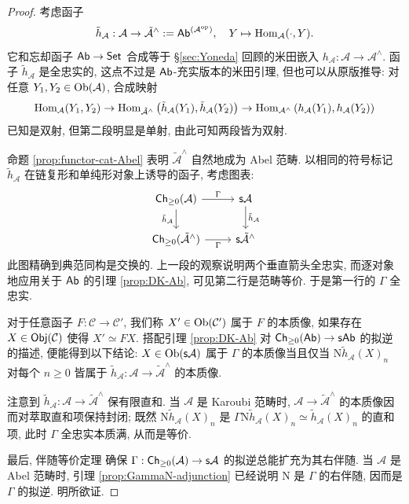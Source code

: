 \begin{proof}
	考虑函子
	\[ \tilde{h}_{\mathcal{A}}: \mathcal{A} \to \tilde{\mathcal{A}}^\wedge := \mathsf{Ab}^{(\mathcal{A}^{\operatorname{op}})}, \quad Y \mapsto \operatorname{Hom}_{\mathcal{A}}(\cdot, Y). \]
	它和忘却函子 $\mathsf{Ab} \to \mathsf{Set}$ 合成等于 \S\ref{sec:Yoneda} 回顾的米田嵌入 $h_{\mathcal{A}}: \mathcal{A} \to \mathcal{A}^\wedge$. 函子 $\tilde{h}_{\mathcal{A}}$ 是全忠实的, 这点不过是 $\mathsf{Ab}$-充实版本的米田引理, 但也可以从原版推导: 对任意 $Y_1, Y_2 \in \operatorname{Ob}(\mathcal{A})$, 合成映射
	\[ \operatorname{Hom}_{\mathcal{A}}(Y_1, Y_2) \to \operatorname{Hom}_{\tilde{\mathcal{A}}^\wedge}\left(\tilde{h}_{\mathcal{A}}(Y_1), \tilde{h}_{\mathcal{A}}(Y_2) \right) \to \operatorname{Hom}_{\mathcal{A}^\wedge}\left( h_{\mathcal{A}}(Y_1), h_{\mathcal{A}}(Y_2)\right) \]
	已知是双射, 但第二段明显是单射, 由此可知两段皆为双射.
	
	命题 \ref{prop:functor-cat-Abel} 表明 $\tilde{\mathcal{A}}^\wedge$ 自然地成为 Abel 范畴. 以相同的符号标记 $\tilde{h}_{\mathcal{A}}$ 在链复形和单纯形对象上诱导的函子, 考虑图表:
	\begin{equation*}\begin{tikzcd}
		\cate{Ch}_{\geq 0}(\mathcal{A}) \arrow[d, "{\tilde{h}_{\mathcal{A}}}"'] \arrow[r, "\Gamma"] & \cate{s}\mathcal{A} \arrow[d, "{\tilde{h}_{\mathcal{A}}}"] \\
		\cate{Ch}_{\geq 0}(\tilde{\mathcal{A}}^\wedge) \arrow[r, "\Gamma"'] & \cate{s}\tilde{\mathcal{A}}^\wedge
	\end{tikzcd}\end{equation*}
	此图精确到典范同构是交换的. 上一段的观察说明两个垂直箭头全忠实, 而逐对象地应用关于 $\mathsf{Ab}$ 的引理 \ref{prop:DK-Ab}, 可见第二行是范畴等价. 于是第一行的 $\Gamma$ 全忠实.
	
	对于任意函子 $F: \mathcal{C} \to \mathcal{C}'$, 我们称 $X' \in \operatorname{Ob}(\mathcal{C}')$ 属于 $F$ 的本质像, 如果存在 $X \in \mathsf{Obj}(\mathcal{C})$ 使得 $X' \simeq FX$. 搭配引理 \ref{prop:DK-Ab} 对 $\mathsf{Ch}_{\geq 0}(\mathsf{Ab}) \to \mathsf{s}\mathsf{Ab}$ 的拟逆的描述, 便能得到以下结论: $X \in \operatorname{Ob}(\mathsf{s}\mathcal{A})$ 属于 $\Gamma$ 的本质像当且仅当 $\mathrm{N} \tilde{h}_{\mathcal{A}}(X)_n$ 对每个 $n \geq 0$ 皆属于 $\tilde{h}_{\mathcal{A}}: \mathcal{A} \to \tilde{\mathcal{A}}^\wedge$ 的本质像.
	
	注意到 $\tilde{h}_{\mathcal{A}}: \mathcal{A} \to \tilde{\mathcal{A}}^\wedge$ 保有限直和.
	当 $\mathcal{A}$ 是 Karoubi 范畴时, $\mathcal{A} \to \tilde{\mathcal{A}}^\wedge$ 的本质像因而对萃取直和项保持封闭; 既然 $\mathrm{N} \tilde{h}_{\mathcal{A}}(X)_n$ 是 $\Gamma\mathrm{N} \tilde{h}_{\mathcal{A}}(X)_n \simeq \tilde{h}_{\mathcal{A}}(X)_n$ 的直和项, 此时 $\Gamma$ 全忠实本质满, 从而是等价.
	
	最后, 伴随等价定理 \cite[定理 2.6.12]{Li1} 确保 $\Gamma: \mathsf{Ch}_{\geq 0}(\mathcal{A}) \to \mathsf{s}\mathcal{A}$ 的拟逆总能扩充为其右伴随. 当 $\mathcal{A}$ 是 Abel 范畴时, 引理 \ref{prop:GammaN-adjunction} 已经说明 $\mathrm{N}$ 是 $\Gamma$ 的右伴随, 因而是 $\Gamma$ 的拟逆. 明所欲证.
\end{proof}

